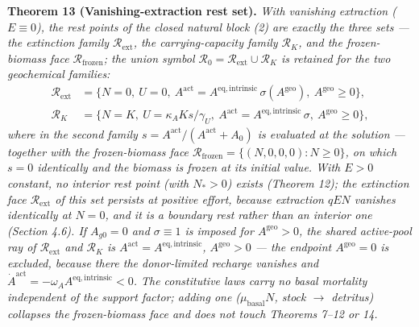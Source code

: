 \documentclass[11pt]{article}
\begin{document}
\textbf{Theorem 13 (Vanishing-extraction rest set).} \emph{With vanishing extraction (\(E \equiv 0\)), the rest points of the closed natural block (2) are exactly the three sets --- the extinction family \(\mathcal{R}_{\mathrm{ext}}\), the carrying-capacity family \(\mathcal{R}_K\), and the frozen-biomass face \(\mathcal{R}_{\mathrm{frozen}}\); the union symbol \(\mathcal{R}_0 = \mathcal{R}_{\mathrm{ext}} \cup \mathcal{R}_K\) is retained for the two geochemical families:}
\[ \begin{aligned} \mathcal{R}_{\mathrm{ext}} &= \bigl\{ N = 0,\ U = 0,\ A^{\mathrm{act}} =
    A^{\mathrm{eq,intrinsic}}\,\sigma(A^{\mathrm{geo}}),\ A^{\mathrm{geo}} \ge 0 \bigr\}, \\[2pt]
    \mathcal{R}_K &= \bigl\{ N = K,\ U = \kappa_A K s/\gamma_U,\ A^{\mathrm{act}} =
    A^{\mathrm{eq,intrinsic}}\,\sigma,\ A^{\mathrm{geo}} \ge 0 \bigr\}, \end{aligned} \]
\emph{where in the second family \(s = A^{\mathrm{act}}/(A^{\mathrm{act}} + A_0)\) is evaluated at the solution --- together with the frozen-biomass face \(\mathcal{R}_{\mathrm{frozen}} = \{(N, 0, 0, 0) : N \ge 0\}\), on which \(s = 0\) identically and the biomass is frozen at its initial value. With \(E > 0\) constant, no interior rest point (with \(N_* > 0\)) exists (Theorem 12); the extinction face \(\mathcal{R}_{\mathrm{ext}}\) of this set persists at positive effort, because extraction \(qEN\) vanishes identically at \(N = 0\), and it is a boundary rest rather than an interior one (Section 4.6). If \(A_{g0} = 0\) and \(\sigma \equiv 1\) is imposed for \(A^{\mathrm{geo}} > 0\), the shared active-pool ray of \(\mathcal{R}_{\mathrm{ext}}\) and \(\mathcal{R}_K\) is \(A^{\mathrm{act}} = A^{\mathrm{eq,intrinsic}}\), \(A^{\mathrm{geo}} > 0\) --- the endpoint \(A^{\mathrm{geo}} = 0\) is excluded, because there the donor-limited recharge vanishes and \(\dot A^{\mathrm{act}} = -\omega_A A^{\mathrm{eq,intrinsic}} < 0\). The constitutive laws carry no basal mortality independent of the support factor; adding one (\(\mu_{\mathrm{basal}} N\), stock \(\to\) detritus) collapses the frozen-biomass face and does not touch Theorems 7--12 or 14.}
\end{document}
